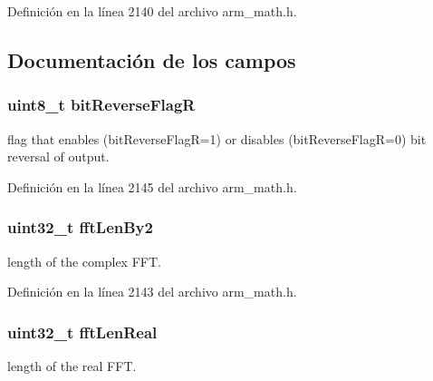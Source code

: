 Definición en la línea 2140 del archivo arm\+\_\+math.\+h.



\subsection{Documentación de los campos}
\subsubsection[{\texorpdfstring{bit\+Reverse\+FlagR}{bitReverseFlagR}}]{\setlength{\rightskip}{0pt plus 5cm}uint8\+\_\+t bit\+Reverse\+FlagR}\hypertarget{structarm__rfft__instance__q15_ad56ec2425e2422108b8767b43d944591}{}\label{structarm__rfft__instance__q15_ad56ec2425e2422108b8767b43d944591}
flag that enables (bit\+Reverse\+FlagR=1) or disables (bit\+Reverse\+FlagR=0) bit reversal of output. 

Definición en la línea 2145 del archivo arm\+\_\+math.\+h.

\subsubsection[{\texorpdfstring{fft\+Len\+By2}{fftLenBy2}}]{\setlength{\rightskip}{0pt plus 5cm}uint32\+\_\+t fft\+Len\+By2}\hypertarget{structarm__rfft__instance__q15_ae7db13e0e2999656d98c4223de5b1284}{}\label{structarm__rfft__instance__q15_ae7db13e0e2999656d98c4223de5b1284}
length of the complex F\+FT. 

Definición en la línea 2143 del archivo arm\+\_\+math.\+h.

\subsubsection[{\texorpdfstring{fft\+Len\+Real}{fftLenReal}}]{\setlength{\rightskip}{0pt plus 5cm}uint32\+\_\+t fft\+Len\+Real}\hypertarget{structarm__rfft__instance__q15_adf0d4604cf5546075d9d4cf122d6c986}{}\label{structarm__rfft__instance__q15_adf0d4604cf5546075d9d4cf122d6c986}
length of the real F\+FT. 

